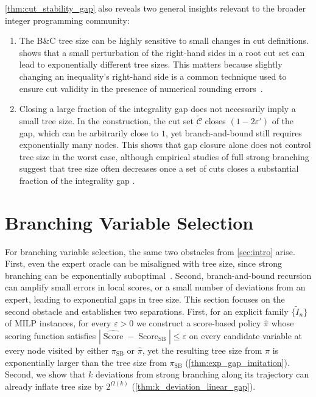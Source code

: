 \documentclass[smallextended,envcountsect]{svjour3} %
\newcommand{\Ccal}{\mathcal{C}}
\newcommand{\0}{\mathbf{0}}
\DeclareMathOperator{\Score}{Score} %
\newcommand{\1}{\mathbf{1}} %
\begin{document}

\begin{remark}
	\cref{thm:cut_stability_gap} also reveals two general insights relevant to the broader integer programming community:
	\begin{enumerate}
		\item The B\&C tree size can be highly sensitive to small changes in cut definitions.  shows that a small perturbation of the right-hand sides in a root cut set can lead to exponentially different tree sizes. This matters because slightly changing an inequality's right-hand side is a common technique used to ensure cut validity in the presence of numerical rounding errors~\citep{cook2009numerically,cornuejols2013safety}.
			\item Closing a large fraction of the integrality gap does not necessarily imply a small tree size. In the construction, the cut set $\widetilde{\Ccal}$ closes $(1-2\varepsilon')$ of the gap, which can be arbitrarily close to $1$, yet branch-and-bound still requires exponentially many nodes. This shows that gap closure alone does not control tree size in the worst case, although empirical studies of full strong branching suggest that tree size often decreases once a set of cuts closes a substantial fraction of the integrality gap \citep{shah2025non}.
	\end{enumerate}
\end{remark}




\section{Branching Variable Selection} \label{sec:branching}

For branching variable selection, the same two obstacles from \cref{sec:intro} arise.
First, even the expert oracle can be misaligned with tree size, since strong branching can be exponentially suboptimal~\citep{dey2024theoretical}.
Second, branch-and-bound recursion can amplify small errors in local scores, or a small number of deviations from an expert, leading to exponential gaps in tree size.
This section focuses on the second obstacle and establishes two separations.
First, for an explicit family $\{\widetilde I_n\}$ of MILP instances, for every $\varepsilon>0$ we construct a score-based policy $\hat\pi$ whose scoring function satisfies $|\widehat{\Score}-\Score_{\mathrm{SB}}|\le \varepsilon$ on every candidate variable at every node visited by either $\pi_{\mathrm{SB}}$ or $\hat\pi$, yet the resulting tree size from $\hat\pi$ is  exponentially larger than the tree size from $\pi_{\mathrm{SB}}$ (\cref{thm:exp_gap_imitation}).
Second, we show that $k$ deviations from strong branching along its trajectory can already inflate tree size by $2^{\Omega(k)}$ (\cref{thm:k_deviation_linear_gap}).
\end{document}
